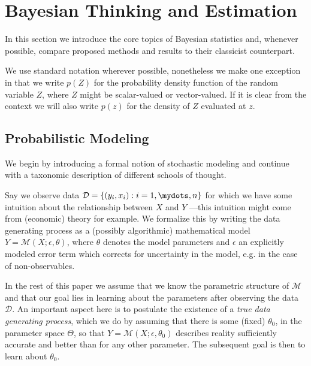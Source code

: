 \setlength{\abovedisplayskip}{2pt}
\setlength{\belowdisplayskip}{2pt}
\section{Bayesian Thinking and Estimation}
\label{sec:bayesian_thinking}
In this section we introduce the core topics of Bayesian statistics and, whenever possible, compare proposed methods and results to their classicist counterpart.

We use standard notation wherever possible, nonetheless we make one exception in that we write $p(Z)$ for the probability density function of the random variable $Z$, where $Z$ might be scalar-valued or vector-valued.
If it is clear from the context we will also write $p(z)$ for the density of $Z$ evaluated at $z$.

\subsection{Probabilistic Modeling}
We begin by introducing a formal notion of stochastic modeling and continue with a taxonomic description of different schools of thought.

Say we observe data $\mathcal{D} = \{(y_i, x_i) : i=1,\mydots,n\}$ for which we have some intuition about the relationship between $X$ and $Y$ ---this intuition might come from (economic) theory for example.
We formalize this by writing the data generating process as a (possibly algorithmic) mathematical model $Y = \mathcal{M}(X; \epsilon, \theta)$, where $\theta$ denotes the model parameters and $\epsilon$ an explicitly modeled error term which corrects for uncertainty in the model, e.g. in the case of non-observables.

In the rest of this paper we assume that we know the parametric structure of $\mathcal{M}$ and that our goal lies in learning about the parameters after observing the data $\mathcal{D}$.
An important aspect here is to postulate the existence of a \textit{true data generating process}, which we do by assuming that there is some (fixed) $\theta_0$, in the parameter space $\Theta$, so that $Y = \mathcal{M}(X; \epsilon, \theta_0)$ describes reality sufficiently accurate and better than for any other parameter.
The subsequent goal is then to learn about $\theta_0$.

